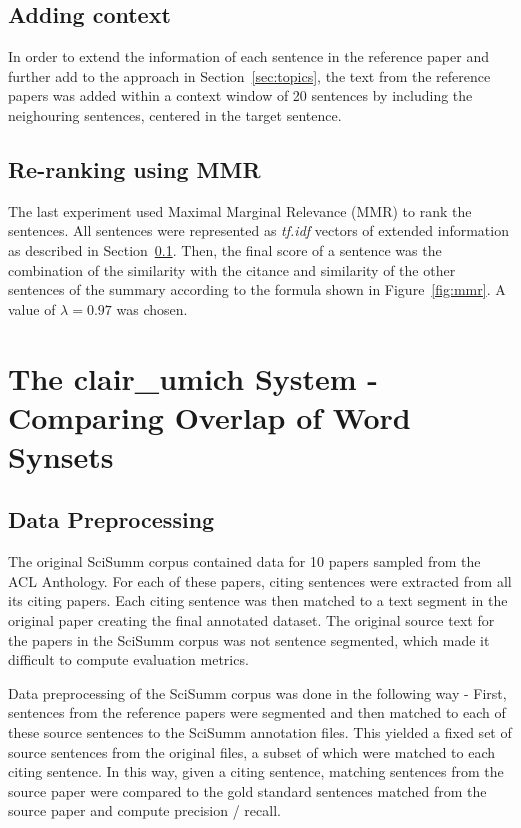 \documentclass[11pt]{article}
\begin{document}
\subsection{Adding context}
\label{sec:context}
In order to  extend the information of each sentence in the reference paper 
and further add to the approach in Section~\ref{sec:topics}, the text from 
the reference papers was added within a context window of 20 sentences by 
including the neighouring sentences, centered in the target sentence.

\subsection{Re-ranking using MMR}
\label{sec:mmr}
The last experiment used Maximal Marginal Relevance (MMR) \cite{Carbonell:1998} 
to rank the sentences. All sentences were represented as \emph{tf.idf} vectors 
of extended information as described in Section~\ref{sec:context}. Then, the 
final score of a sentence was the combination of the similarity with the 
citance and similarity of the other sentences of the summary according to the 
formula shown in Figure~\ref{fig:mmr}. A value of $\lambda=0.97$ was chosen.


\section{The clair\_umich System - Comparing Overlap of Word Synsets}
\subsection{Data Preprocessing}

The original SciSumm corpus contained data for 10 papers sampled from the ACL 
Anthology. For each of these papers, citing sentences were extracted from all 
its citing papers. Each citing sentence was then matched to a text segment in 
the original paper creating the final annotated dataset. The original source 
text for the papers in the SciSumm corpus was not sentence segmented, which 
made it difficult to compute evaluation metrics.

Data preprocessing of the SciSumm corpus was done in the following way - First, 
sentences from the reference papers were segmented and then matched to each of 
these source sentences to the SciSumm annotation files. This yielded a fixed 
set of source sentences from the original files, a subset of which were 
matched to each citing sentence. In this way, given a citing sentence, 
matching sentences from the source paper were compared to the gold standard 
sentences matched from the source paper and compute precision / recall. 
\end{document}
